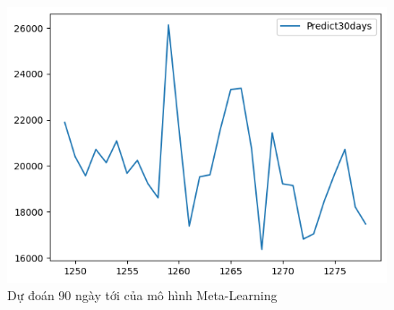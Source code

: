 \begin{figure}[H]
\begin{minipage}{0.15\textwidth}
    \includegraphics[width=1\textwidth]{resources/chapter-5/predicted/EXB_ML_9_1_next30days.png}
    \end{minipage}
    \hfill
    
    \caption{Dự đoán 90 ngày tới của mô hình Meta-Learning}
    \label{fig:ml_predicted}
\end{figure}


